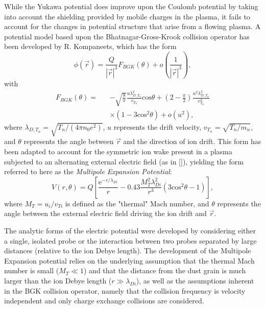 \documentclass[aip,amsmath,amssymb,graphicx,floatfix,reprint]{revtex4-1}
\begin{document}
While the Yukawa potential does improve upon the Coulomb potential by taking into account the shielding provided by mobile charges in the plasma, it fails to account for the changes in potential structure that arise from a flowing plasma.  A potential model based upon the Bhatnagar-Gross-Krook collision operator has been developed by R. Kompaneets\cite{KompaneetsDiss}, which has the form \begin{equation}\phi(\vec{r}) = \frac{Q}{|\vec{r}|^3}F_{BGK}(\theta) + o\left(\frac{1}{|\vec{r}|^3}\right),\label{eq:kompPot}\end{equation} with 
\begin{eqnarray}F_{BGK}(\theta) =&& -\sqrt{\frac{8}{\pi}}\frac{u\lambda_{D,T_n}^2}{v_{T_n}}\mathrm{cos}\theta + \left(2-\frac{\pi}{2}\right)\frac{u^2\lambda_{D,T_n}^2}{v_{T_n}^2}\nonumber \\
& & \times\left(1-3\mathrm{cos}^2\theta\right) +o(u^2),\label{eq:kompPot2}\end{eqnarray} where $\lambda_{D,T_n}=\sqrt{T_n/(4\pi n_0e^2)}$, $u$ represents the drift velocity, $v_{T_n} = \sqrt{T_n/m_n}$, and $\theta$ represents the angle between $\vec{r}$ and the direction of ion drift.  This form has been adapted to account for the symmetric ion wake present in a plasma subjected to an alternating external electric field (as in []), yielding the form referred to here as the \emph{Multipole Expansion Potential}:
\begin{equation} V(r,\theta) = Q\left[\frac{\mathrm{e}^{-r/\lambda_{Di}}}{r} - 0.43\frac{M_T^2\lambda_{Di}^2}{r^3}\left(3\mathrm{cos}^2\theta - 1\right)\right],\label{eq:ivlevpot}\end{equation}
where $M_T=u_i/v_{Ti}$ is defined as the "thermal" Mach number, and $\theta$ represents the angle between the external electric field driving the ion drift and $\vec{r}$.

The analytic forms of the electric potential were developed by considering either a single, isolated probe or the interaction between two probes separated by large distances (relative to the ion Debye length).  The development of the Multipole Expansion potential relies on the underlying assumption that the thermal Mach number is small ($M_T \ll 1$) and that the distance from the dust grain is much larger than the ion Debye length ($r \gg \lambda_{Di}$), as well as the assumptions inherent in the BGK collision operator, namely that the collision frequency is velocity independent and only charge exchange collisions are considered.
\end{document}
